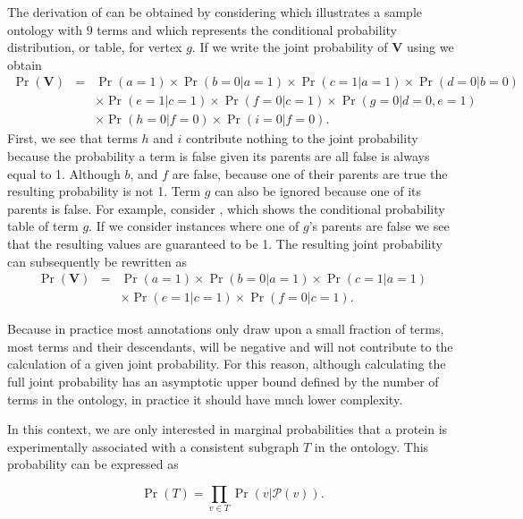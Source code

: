 The derivation of  can be obtained by considering  which illustrates a sample ontology with $9$ terms and  which represents the conditional probability distribution, or table, for vertex $g$.  If we write the joint probability of $\mathbf{V}$ using  we obtain 
\begin{eqnarray*}
\Pr(\mathbf{V}) &= &\Pr(a=1) \times \Pr(b=0|a=1) \times \Pr(c=1|a=1) \times \Pr(d=0|b=0)\\
 & &  \times \Pr(e=1|c=1) \times \Pr(f=0|c=1) \times \Pr(g=0|d=0,e=1)\\
  & & \times \Pr(h=0|f=0) \times \Pr(i=0|f=0).
\end{eqnarray*}
First, we see that terms $h$ and $i$ contribute nothing to the joint probability because the probability a term is false given its parents are all false is always equal to 1.  Although $b$, and $f$ are false, because one of their parents are true the resulting probability is not 1.  Term $g$ can also be ignored because one of its parents is false.  For example, consider , which shows the conditional probability table of term $g$.  If we consider instances where one of $g$'s parents are false we see that the resulting values are guaranteed to be 1. The resulting joint probability can subsequently be rewritten as 
\begin{eqnarray*}
\Pr (\mathbf{V}) & = &\Pr(a=1) \times \Pr(b=0|a=1) \times \Pr(c=1|a=1)\\  
 & & \times \Pr(e=1|c=1) \times \Pr(f=0|c=1).
\end{eqnarray*}

Because in practice most annotations only draw upon a small fraction of terms, most terms and their descendants, will be negative and will not contribute to the calculation of a given joint probability.  For this reason, although calculating the full joint probability has an asymptotic upper bound defined by the number of terms in the ontology, in practice it should have much lower complexity.

In this context, we are only interested in marginal probabilities that a protein is experimentally associated with a consistent subgraph $T$ in the ontology. This probability can be expressed as

\begin{equation}
\Pr(T)=\underset{v\in T}{\prod}\Pr(v|\mathcal{P}(v)).
\label{eq:factorization}
\end{equation}

